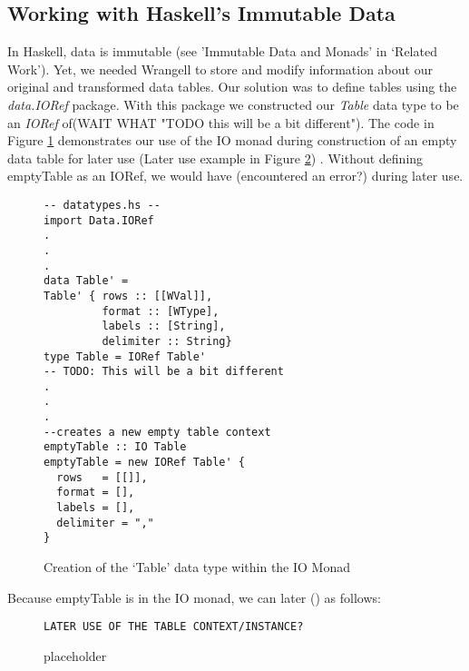 \documentclass[preprint,nocopyrightspace]{sig-alternate}
\begin{document}
\subsection{Working with Haskell's Immutable Data}
In Haskell, data is immutable (see 'Immutable Data and Monads' in `Related Work'). Yet, we needed Wrangell to store and modify information about our original and transformed data tables. Our solution was to define tables using the \emph{data.IORef} package. With this package we constructed our \emph{Table} data type to be an \emph{IORef} of(WAIT WHAT "TODO this will be a bit different"). The code in Figure \ref{tableIORef} demonstrates our use of the IO monad during construction of an empty data table for later use (Later use example in Figure \ref{tableIoRefLaterUse}) . 
Without defining emptyTable as an IORef, we would have (encountered an error?) during later use. 

\begin{figure}
\caption{Creation of the `Table' data type within the IO Monad}
\begin{lstlisting}
-- datatypes.hs --
import Data.IORef
.
.
.
data Table' = 
Table' { rows :: [[WVal]], 
         format :: [WType], 
         labels :: [String], 
         delimiter :: String}
type Table = IORef Table' 
-- TODO: This will be a bit different
.
.
.
--creates a new empty table context
emptyTable :: IO Table
emptyTable = new IORef Table' {    
  rows   = [[]],
  format = [],
  labels = [],
  delimiter = ","
}
\end{lstlisting}
\label{tableIORef}
\end{figure}
Because emptyTable is in the IO monad, we can later () as follows:
\begin{figure}
\caption{placeholder}
\begin{lstlisting}
LATER USE OF THE TABLE CONTEXT/INSTANCE?
\end{lstlisting}
\label{tableIoRefLaterUse}
\end{figure}
\end{document}

